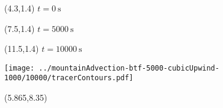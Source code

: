 \documentclass[a4]{article}
\begin{document}
\TPMargin{1pt}
\begin{textblock}{4}(4.3,1.4)
\normalsize
$t = \SI{0}{\second}$
\end{textblock}
\begin{textblock}{4}(7.5,1.4)
\normalsize
$t = \SI{5000}{\second}$
\end{textblock}
\begin{textblock}{4}(11.5,1.4)
\normalsize
$t = \SI{10000}{\second}$
\end{textblock}
\centering
\texttt{[image: ../mountainAdvection-btf-5000-cubicUpwind-1000/10000/tracerContours.pdf]}
\begin{textblock}{5}(5.865,8.35)
\end{textblock}
\end{document}
